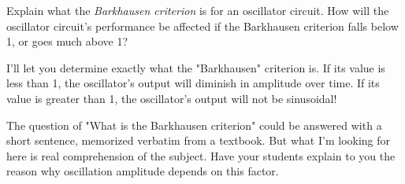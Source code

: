 

Explain what the {\it Barkhausen criterion} is for an oscillator circuit.  How will the oscillator circuit's performance be affected if the Barkhausen criterion falls below 1, or goes much above 1?







I'll let you determine exactly what the "Barkhausen" criterion is.  If its value is less than 1, the oscillator's output will diminish in amplitude over time.  If its value is greater than 1, the oscillator's output will not be sinusoidal!







The question of "What is the Barkhausen criterion" could be answered with a short sentence, memorized verbatim from a textbook.  But what I'm looking for here is real comprehension of the subject.  Have your students explain to you the reason why oscillation amplitude depends on this factor.




